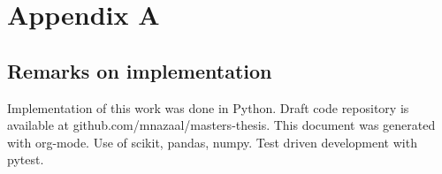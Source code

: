 \documentclass{tufte-book}
\begin{document}
 \newpage 






 \newpage 

\chapter{Appendix A}
\label{sec:orgaa99d5f}
\section{Remarks on implementation}
\label{sec:org60d9014}
Implementation of this work was done in Python. Draft code repository is available at github.com/mnazaal/masters-thesis. This document was generated with org-mode. Use of scikit, pandas, numpy. Test driven development with pytest.
\end{document}
